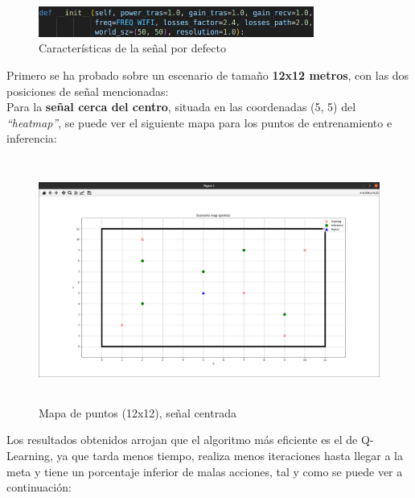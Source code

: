 \begin{figure} [H]
    \begin{center}
    \includegraphics[height=1cm]{imagenes/cap4/16_default_values.png}
    \end{center}
    \caption[Características de la señal por defecto]{Características de la señal por defecto}
    \label{fig:compare_graph}
\end{figure}

Primero se ha probado sobre un escenario de tamaño \textbf{12x12 metros}, con las dos posiciones de señal mencionadas:\\

Para la \textbf{señal cerca del centro}, situada en las coordenadas (5, 5) del \emph{``heatmap''}, se puede ver el siguiente mapa para los puntos de entrenamiento e inferencia:\\

\begin{figure} [H]
    \begin{center}
    \includegraphics[height=8cm]{imagenes/cap4/17_mapa_p_centro_12.png}
    \end{center}
    \caption[Mapa de puntos (12x12), señal centrada]{Mapa de puntos (12x12), señal centrada}
    \label{fig:map_p_center_12}
\end{figure}

Los resultados obtenidos arrojan que el algoritmo más eficiente es el de Q-Learning, ya que tarda menos tiempo, realiza menos iteraciones hasta llegar a la meta y tiene un porcentaje inferior de malas acciones, tal y como se puede ver a continuación:\\

